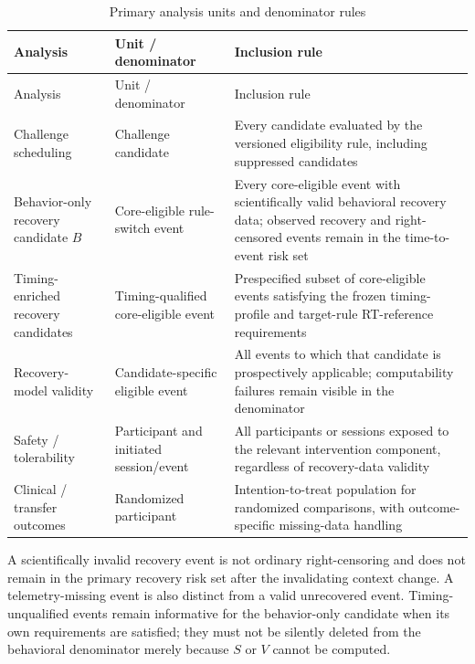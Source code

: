 \begingroup
\small
\setlength{\LTpre}{6pt}
\setlength{\LTpost}{6pt}
\renewcommand{\arraystretch}{1.1}
\begin{longtable}{p{3.0cm}p{4.0cm}p{5.0cm}}
\caption{Primary analysis units and denominator rules}\\
\toprule
Analysis & Unit / denominator & Inclusion rule \\

\midrule
\endfirsthead
\toprule
Analysis & Unit / denominator & Inclusion rule \\

\midrule
\endhead
\midrule
\endfoot
\bottomrule
\endlastfoot
Challenge scheduling & Challenge candidate & Every candidate evaluated by the versioned eligibility rule, including suppressed candidates \\
Behavior-only recovery candidate \(B\) & Core-eligible rule-switch event & Every core-eligible event with scientifically valid behavioral recovery data; observed recovery and right-censored events remain in the time-to-event risk set \\
Timing-enriched recovery candidates & Timing-qualified core-eligible event & Prespecified subset of core-eligible events satisfying the frozen timing-profile and target-rule RT-reference requirements \\
Recovery-model validity & Candidate-specific eligible event & All events to which that candidate is prospectively applicable; computability failures remain visible in the denominator \\
Safety / tolerability & Participant and initiated session/event & All participants or sessions exposed to the relevant intervention component, regardless of recovery-data validity \\
Clinical / transfer outcomes & Randomized participant & Intention-to-treat population for randomized comparisons, with outcome-specific missing-data handling \\
\end{longtable}
\endgroup

A scientifically invalid recovery event is not ordinary right-censoring and does not remain in the primary recovery risk set after the invalidating context change. A telemetry-missing event is also distinct from a valid unrecovered event. Timing-unqualified events remain informative for the behavior-only candidate when its own requirements are satisfied; they must not be silently deleted from the behavioral denominator merely because \(S\) or \(V\) cannot be computed.

